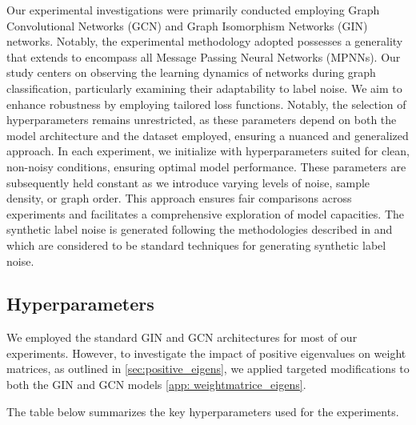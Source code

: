 {Our experimental investigations were primarily conducted employing Graph Convolutional Networks (GCN)  \cite{gcn} and Graph Isomorphism Networks (GIN) \cite{WL1} networks. Notably, the experimental methodology adopted possesses a generality that extends to encompass all Message Passing Neural Networks (MPNNs). Our study centers on observing the learning dynamics of networks during graph classification, particularly examining their adaptability to label noise. We aim to enhance robustness by employing tailored loss functions. Notably, the selection of hyperparameters remains unrestricted, as these parameters depend on both the model architecture and the dataset employed, ensuring a nuanced and generalized approach. In each experiment, we initialize with hyperparameters suited for clean, non-noisy conditions, ensuring optimal model performance. These parameters are subsequently held constant as we introduce varying levels of noise, sample density, or graph order. This approach ensures fair comparisons across experiments and facilitates a comprehensive exploration of model capacities. The synthetic label noise is generated following the methodologies described in \cite{https://doi.org/10.48550/arxiv.1804.06872} and \cite{xia2021robust} which are considered to be standard techniques for generating synthetic label noise.



\subsection{Hyperparameters}
We employed the standard GIN \cite{WL1} and GCN \cite{gcn} architectures for most of our experiments. However, to investigate the impact of positive eigenvalues on weight matrices, as outlined in \ref{sec:positive_eigens}, we applied targeted modifications to both the GIN and GCN models \ref{app: weightmatrice_eigens}.

The table below summarizes the key hyperparameters used for the experiments.

}
